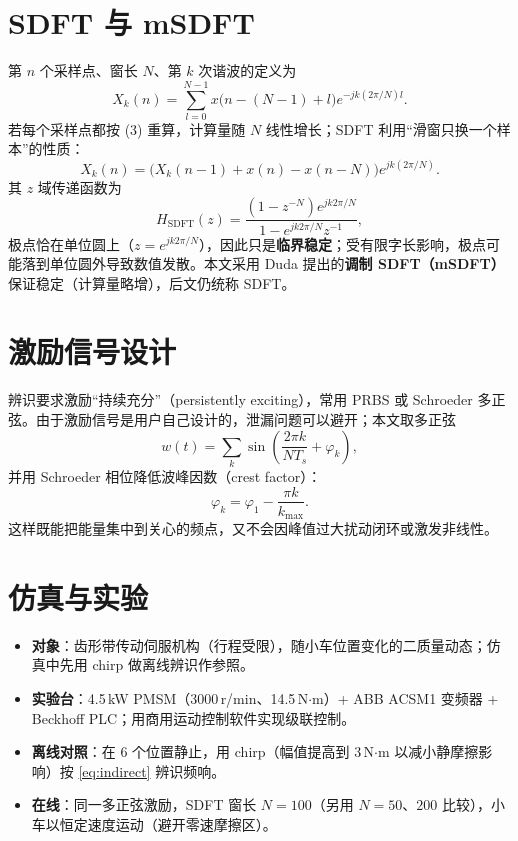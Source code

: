 \documentclass[UTF8,a4paper,11pt]{ctexart}
\begin{document}
\section{SDFT 与 mSDFT}
第 $n$ 个采样点、窗长 $N$、第 $k$ 次谐波的定义为
\begin{equation}
X_k(n)=\sum_{l=0}^{N-1}x\big(n-(N-1)+l\big)e^{-jk(2\pi/N)l}.
\end{equation}
若每个采样点都按 (3) 重算，计算量随 $N$ 线性增长；SDFT 利用“滑窗只换一个样本”的性质：
\begin{equation}
X_k(n)=\big(X_k(n-1)+x(n)-x(n-N)\big)e^{jk(2\pi/N)}.
\label{eq:sdf}
\end{equation}
其 $z$ 域传递函数为
\begin{equation}
H_{\mathrm{SDFT}}(z)=\frac{(1-z^{-N})e^{jk2\pi/N}}{1-e^{jk2\pi/N}z^{-1}},
\end{equation}
极点恰在单位圆上（$z=e^{jk2\pi/N}$），因此只是\textbf{临界稳定}；受有限字长影响，极点可能落到单位圆外导致数值发散。本文采用 Duda 提出的\textbf{调制 SDFT（mSDFT）}保证稳定（计算量略增），后文仍统称 SDFT。

\section{激励信号设计}
辨识要求激励“持续充分”（persistently exciting），常用 PRBS 或 Schroeder 多正弦。由于激励信号是用户自己设计的，泄漏问题可以避开；本文取多正弦
\begin{equation}
w(t)=\sum_k \sin\left(\frac{2\pi k}{N T_s}+\varphi_k\right),
\end{equation}
并用 Schroeder 相位降低波峰因数（crest factor）：
\begin{equation}
\varphi_k=\varphi_1-\frac{\pi k}{k_{\max}}.
\end{equation}
这样既能把能量集中到关心的频点，又不会因峰值过大扰动闭环或激发非线性。

\section{仿真与实验}
\begin{itemize}
  \item \textbf{对象}：齿形带传动伺服机构（行程受限），随小车位置变化的二质量动态；仿真中先用 chirp 做离线辨识作参照。
  \item \textbf{实验台}：4.5\,kW PMSM（3000\,r/min、14.5\,N$\cdot$m）+ ABB ACSM1 变频器 + Beckhoff PLC；用商用运动控制软件实现级联控制。
  \item \textbf{离线对照}：在 6 个位置静止，用 chirp（幅值提高到 3\,N$\cdot$m 以减小静摩擦影响）按 \eqref{eq:indirect} 辨识频响。
  \item \textbf{在线}：同一多正弦激励，SDFT 窗长 $N=100$（另用 $N=50$、$200$ 比较），小车以恒定速度运动（避开零速摩擦区）。
\end{itemize}
\end{document}
